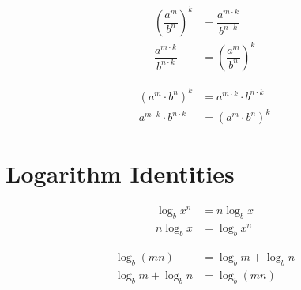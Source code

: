 \documentclass[20150903-160354-rs2.2-MarksMathNotebook.tex]{subfiles}
\begin{document}
\begin{aidentity}
\begin{subequations}
\begin{align}
	\left(\dfrac{a^m}{b^n}\right)^k &= \dfrac{a^{m \cdot k}}{b^{n\cdot k}} \label{eq:poqpo1}\\
	\dfrac{a^{m \cdot k}}{b^{n\cdot k}} &= \left(\dfrac{a^m}{b^n}\right)^k \label{eq:poqpo2}
\end{align}
\end{subequations}
\end{aidentity}

\begin{aidentity}
\begin{subequations}
\begin{align}
	\left(a^m \cdot b^n\right)^k &= a^{m \cdot k} \cdot b^{n\cdot k} \label{eq:poprpo1}\\
	a^{m \cdot k} \cdot b^{n \cdot k} &= \left(a^m \cdot b^n\right)^k \label{eq:poprpo2}
\end{align}
\end{subequations}
\end{aidentity}


\section{Logarithm Identities}

\begin{aidentity}
\begin{subequations}
\begin{align}
	\log_b x^n &= n \log_b x \label{eq:lpopo1}\\
	n \log_b x &= \log_b x^n \label{eq:lpopo2}
\end{align}
\end{subequations}
\end{aidentity}

\begin{aidentity}
\begin{subequations}
\begin{align}
	\log_b (mn) &= \log_b m + \log_b n \label{eq:lprcbpo1}\\
	\log_b m + \log_b n &= \log_b (mn) \label{eq:lprcbpo2}
\end{align}
\end{subequations}
\end{aidentity}
\end{document}
